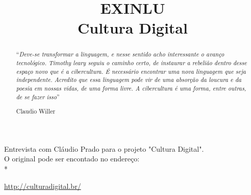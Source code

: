 %
%
%
%
%

% 
%
%
%
%
%
%
%
%
%
%
%

%
%

%
%
\pagestyle{empty}
%
\title{EXINLU \\ Cultura Digital}
\author{}
\date{}
\maketitle
\renewcommand{\abstractname}{}
%
\begin{abstract}
\noindent``\emph{Deve-se transformar a linguagem, e nesse sentido acho 
interessante o avanço tecnológico. Timothy leary seguiu o caminho certo, 
de instaurar a rebelião dentro desse espaço novo que é a cibercultura. É 
necessário encontrar uma nova linguagem que seja independente. Acredito 
que essa linguagem pode vir de uma absorção da loucura e da poesia em 
nossas vidas, de uma forma livre. A cibercultura é uma forma, entre 
outras, de se fazer isso}''
\begin{flushright}Claudio Willer\end{flushright}
\end{abstract}
\vfill
\begin{small}
Entrevista com Cláudio Prado para o projeto "Cultura Digital".\\
O original pode ser encontado no endereço:\\*
\begin{flushright}\url{http://culturadigital.br/}\end{flushright}
\end{small}
\newpage
%
%

